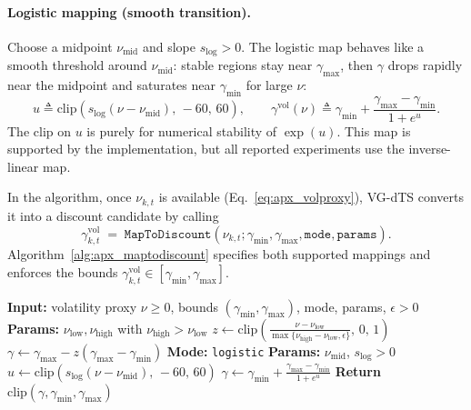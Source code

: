 \paragraph{Logistic mapping (smooth transition).}
Choose a midpoint $\nu_{\mathrm{mid}}$ and slope $s_{\log}>0$.
The logistic map behaves like a smooth threshold around $\nu_{\mathrm{mid}}$: stable regions stay near $\gamma_{\max}$, then $\gamma$ drops rapidly near the midpoint and saturates near $\gamma_{\min}$ for large $\nu$:
\begin{equation}
u \triangleq \mathrm{clip}\!\left(s_{\log}(\nu-\nu_{\mathrm{mid}}),\, -60,\, 60\right),\qquad
\gamma^{\mathrm{vol}}(\nu)\triangleq \gamma_{\min}+\frac{\gamma_{\max}-\gamma_{\min}}{1+e^{u}}.
\label{eq:apx_map_logistic}
\end{equation}
The clip on $u$ is purely for numerical stability of $\exp(u)$. This map is supported by the implementation, but all reported experiments use the inverse-linear map.

In the algorithm, once $\nu_{k,t}$ is available (Eq.~\eqref{eq:apx_volproxy}), VG-dTS converts it into a discount candidate by calling
\[
\gamma^{\mathrm{vol}}_{k,t} \;=\; \texttt{MapToDiscount}(\nu_{k,t};\gamma_{\min},\gamma_{\max},\texttt{mode},\texttt{params}).
\]
Algorithm~\ref{alg:apx_maptodiscount} specifies both supported mappings and enforces the bounds $\gamma^{\mathrm{vol}}_{k,t}\in[\gamma_{\min},\gamma_{\max}]$.

\begin{algorithm}[t]
\caption{\texttt{MapToDiscount}$(\nu;\gamma_{\min},\gamma_{\max},\texttt{mode},\texttt{params})$}
\label{alg:apx_maptodiscount}
\begin{algorithmic}[1]
\STATE \textbf{Input:} volatility proxy $\nu\ge 0$, bounds $(\gamma_{\min},\gamma_{\max})$, mode, params, $\epsilon>0$
    \STATE \textbf{Params:} $\nu_{\mathrm{low}},\nu_{\mathrm{high}}$ with $\nu_{\mathrm{high}}>\nu_{\mathrm{low}}$
    \STATE $z \leftarrow \mathrm{clip}\!\left(\frac{\nu-\nu_{\mathrm{low}}}{\max\{\nu_{\mathrm{high}}-\nu_{\mathrm{low}},\epsilon\}},\,0,\,1\right)$
    \STATE $\gamma \leftarrow \gamma_{\max}-z(\gamma_{\max}-\gamma_{\min})$
\ELSE
    \STATE \textbf{Mode:} \texttt{logistic}
    \STATE \textbf{Params:} $\nu_{\mathrm{mid}}$, $s_{\log}>0$
    \STATE $u \leftarrow \mathrm{clip}\!\left(s_{\log}(\nu-\nu_{\mathrm{mid}}),\, -60,\, 60\right)$
    \STATE $\gamma \leftarrow \gamma_{\min}+\frac{\gamma_{\max}-\gamma_{\min}}{1+e^{u}}$
\ENDIF
\STATE \textbf{Return} $\mathrm{clip}(\gamma,\gamma_{\min},\gamma_{\max})$
\end{algorithmic}
\end{algorithm}

